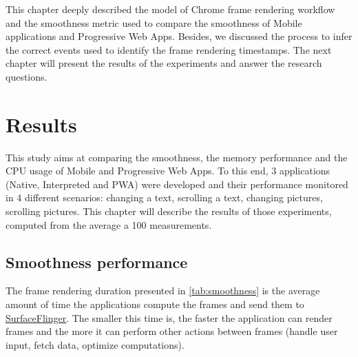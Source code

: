 \documentclass{kththesis}
\begin{document}
This chapter deeply described the model of Chrome frame rendering workflow and the smoothness metric used to compare the smoothness of Mobile applications and Progressive Web Apps. Besides, we discussed the process to infer the correct events used to identify the frame rendering timestamps. The next chapter will present the results of the experiments and answer the research questions.

\chapter{Results}
\label{ch:results}

This study aims at comparing the smoothness, the memory performance and the CPU usage of Mobile and Progressive Web Apps. To this end, 3 applications (Native, Interpreted and PWA) were developed and their performance monitored in 4 different scenarios: changing a text, scrolling a text, changing pictures, scrolling pictures. This chapter will describe the results of those experiments, computed from the average a 100 measurements. 

\label{results:performance}

\section{Smoothness performance}

The frame rendering duration presented in \autoref{tab:smoothness} is the average amount of time the applications compute the frames and send them to \hyperref[def:surfaceflinger]{SurfaceFlinger}. The smaller this time is, the faster the application can render frames and the more it can perform other actions between frames (handle user input, fetch data, optimize computations). 
\end{document}
